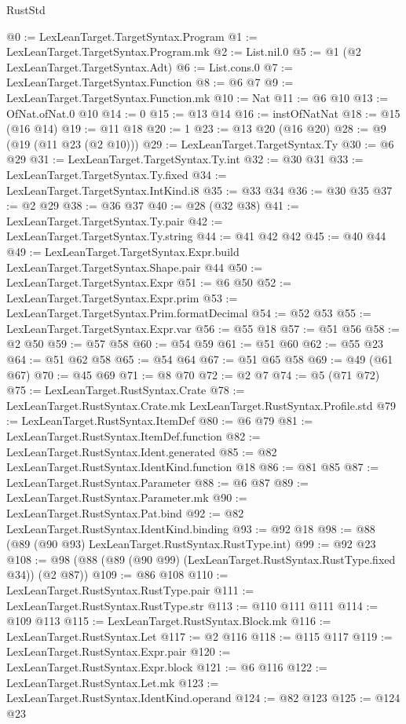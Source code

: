 \begin{lexlean}{RustStd}
\begin{coremodule}
@0 := LexLeanTarget.TargetSyntax.Program
@1 := LexLeanTarget.TargetSyntax.Program.mk
@2 := List.nil.{0}
@5 := @1 (@2 LexLeanTarget.TargetSyntax.Adt)
@6 := List.cons.{0}
@7 := LexLeanTarget.TargetSyntax.Function
@8 := @6 @7
@9 := LexLeanTarget.TargetSyntax.Function.mk
@10 := Nat
@11 := @6 @10
@13 := OfNat.ofNat.{0} @10
@14 := 0
@15 := @13 @14
@16 := instOfNatNat
@18 := @15 (@16 @14)
@19 := @11 @18
@20 := 1
@23 := @13 @20 (@16 @20)
@28 := @9 (@19 (@11 @23 (@2 @10)))
@29 := LexLeanTarget.TargetSyntax.Ty
@30 := @6 @29
@31 := LexLeanTarget.TargetSyntax.Ty.int
@32 := @30 @31
@33 := LexLeanTarget.TargetSyntax.Ty.fixed
@34 := LexLeanTarget.TargetSyntax.IntKind.i8
@35 := @33 @34
@36 := @30 @35
@37 := @2 @29
@38 := @36 @37
@40 := @28 (@32 @38)
@41 := LexLeanTarget.TargetSyntax.Ty.pair
@42 := LexLeanTarget.TargetSyntax.Ty.string
@44 := @41 @42 @42
@45 := @40 @44
@49 := LexLeanTarget.TargetSyntax.Expr.build LexLeanTarget.TargetSyntax.Shape.pair @44
@50 := LexLeanTarget.TargetSyntax.Expr
@51 := @6 @50
@52 := LexLeanTarget.TargetSyntax.Expr.prim
@53 := LexLeanTarget.TargetSyntax.Prim.formatDecimal
@54 := @52 @53
@55 := LexLeanTarget.TargetSyntax.Expr.var
@56 := @55 @18
@57 := @51 @56
@58 := @2 @50
@59 := @57 @58
@60 := @54 @59
@61 := @51 @60
@62 := @55 @23
@64 := @51 @62 @58
@65 := @54 @64
@67 := @51 @65 @58
@69 := @49 (@61 @67)
@70 := @45 @69
@71 := @8 @70
@72 := @2 @7
@74 := @5 (@71 @72)
@75 := LexLeanTarget.RustSyntax.Crate
@78 := LexLeanTarget.RustSyntax.Crate.mk LexLeanTarget.RustSyntax.Profile.std
@79 := LexLeanTarget.RustSyntax.ItemDef
@80 := @6 @79
@81 := LexLeanTarget.RustSyntax.ItemDef.function
@82 := LexLeanTarget.RustSyntax.Ident.generated
@85 := @82 LexLeanTarget.RustSyntax.IdentKind.function @18
@86 := @81 @85
@87 := LexLeanTarget.RustSyntax.Parameter
@88 := @6 @87
@89 := LexLeanTarget.RustSyntax.Parameter.mk
@90 := LexLeanTarget.RustSyntax.Pat.bind
@92 := @82 LexLeanTarget.RustSyntax.IdentKind.binding
@93 := @92 @18
@98 := @88 (@89 (@90 @93) LexLeanTarget.RustSyntax.RustType.int)
@99 := @92 @23
@108 := @98 (@88 (@89 (@90 @99) (LexLeanTarget.RustSyntax.RustType.fixed @34)) (@2 @87))
@109 := @86 @108
@110 := LexLeanTarget.RustSyntax.RustType.pair
@111 := LexLeanTarget.RustSyntax.RustType.str
@113 := @110 @111 @111
@114 := @109 @113
@115 := LexLeanTarget.RustSyntax.Block.mk
@116 := LexLeanTarget.RustSyntax.Let
@117 := @2 @116
@118 := @115 @117
@119 := LexLeanTarget.RustSyntax.Expr.pair
@120 := LexLeanTarget.RustSyntax.Expr.block
@121 := @6 @116
@122 := LexLeanTarget.RustSyntax.Let.mk
@123 := LexLeanTarget.RustSyntax.IdentKind.operand
@124 := @82 @123
@125 := @124 @23

\end{coremodule}
\end{lexlean}
